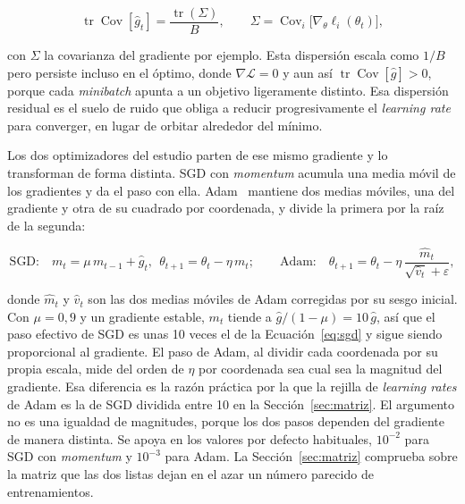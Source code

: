 \begin{equation}
\operatorname{tr}\operatorname{Cov}[\hat{g}_t] = \frac{\operatorname{tr}(\Sigma)}{B},
\qquad
\Sigma = \operatorname{Cov}_i\!\big[\nabla_\theta \ell_i(\theta_t)\big],
\label{eq:sgd-var}
\end{equation}

con $\Sigma$ la covarianza del gradiente por ejemplo. Esta dispersión escala como $1/B$ pero persiste incluso en el óptimo, donde $\nabla \mathcal{L} = 0$ y aun así $\operatorname{tr}\operatorname{Cov}[\hat{g}] > 0$, porque cada \emph{minibatch} apunta a un objetivo ligeramente distinto. Esa dispersión residual es el suelo de ruido que obliga a reducir progresivamente el \emph{learning rate} para converger, en lugar de orbitar alrededor del mínimo.

Los dos optimizadores del estudio parten de ese mismo gradiente y lo transforman de forma distinta. SGD con \emph{momentum} acumula una media móvil de los gradientes y da el paso con ella. Adam~\cite{kingma2015adam} mantiene dos medias móviles, una del gradiente y otra de su cuadrado por coordenada, y divide la primera por la raíz de la segunda:

\begin{equation}
\text{SGD:}\quad m_t = \mu\, m_{t-1} + \hat{g}_t,\ \ \theta_{t+1} = \theta_t - \eta\, m_t;
\qquad
\text{Adam:}\quad \theta_{t+1} = \theta_t - \eta\, \frac{\hat{m}_t}{\sqrt{\hat{v}_t} + \varepsilon},
\label{eq:momentum-adam}
\end{equation}

donde $\hat{m}_t$ y $\hat{v}_t$ son las dos medias móviles de Adam corregidas por su sesgo inicial. Con $\mu = 0{,}9$ y un gradiente estable, $m_t$ tiende a $\hat{g}/(1 - \mu) = 10\,\hat{g}$, así que el paso efectivo de SGD es unas 10 veces el de la Ecuación~\ref{eq:sgd} y sigue siendo proporcional al gradiente. El paso de Adam, al dividir cada coordenada por su propia escala, mide del orden de $\eta$ por coordenada sea cual sea la magnitud del gradiente. Esa diferencia es la razón práctica por la que la rejilla de \emph{learning rates} de Adam es la de SGD dividida entre 10 en la Sección~\ref{sec:matriz}. El argumento no es una igualdad de magnitudes, porque los dos pasos dependen del gradiente de manera distinta. Se apoya en los valores por defecto habituales, $10^{-2}$ para SGD con \emph{momentum} y $10^{-3}$ para Adam. La Sección~\ref{sec:matriz} comprueba sobre la matriz que las dos listas dejan en el azar un número parecido de entrenamientos.

